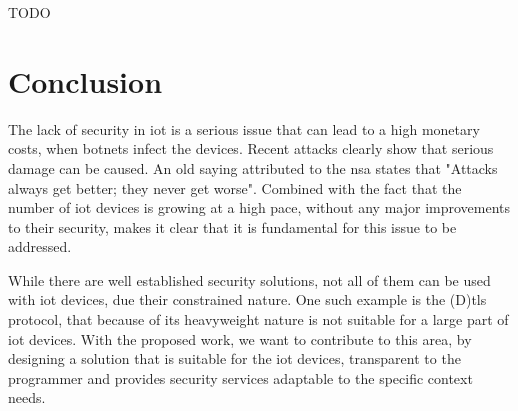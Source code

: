 \documentclass{llncs}
\begin{document}
TODO

\section{Conclusion} 
 
The lack of security in \gls{iot} is a serious issue that can lead to a high monetary costs,
when botnets infect the devices. Recent
attacks clearly show that serious damage can be caused. An old saying attributed to the
\gls{nsa} states that "Attacks always get better; they never get worse".
Combined with the fact that the number of \gls{iot} devices is growing at a high
pace, without any major improvements to their security, makes it clear
that it is fundamental for this issue to be addressed.

While there are well established security solutions, not all of them can be used
with \gls{iot} devices, due their constrained nature. One such example is
the (D)\gls{tls} protocol, that because of its heavyweight nature is not suitable for a large part of \gls{iot} devices. With the proposed work,
we want to contribute to this area, by designing a solution that is suitable for the \gls{iot} devices, transparent
to the programmer and provides security services adaptable to the specific context needs.

%
\nocite{*}


%
\printglossary[style=long]
%
\end{document}
